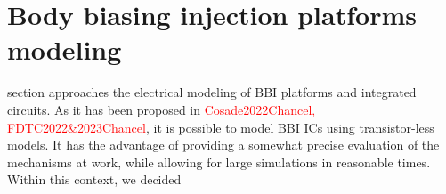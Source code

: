
\section{Body biasing injection platforms modeling}
 section approaches the electrical modeling of BBI platforms and integrated circuits.
As it has been proposed in \textcolor{red}{Cosade2022Chancel, FDTC2022\&2023Chancel}, it is possible to model BBI ICs using transistor-less models.
It has the advantage of providing a somewhat precise evaluation of the mechanisms at work, while allowing for large simulations in reasonable times.
Within this context, we decided